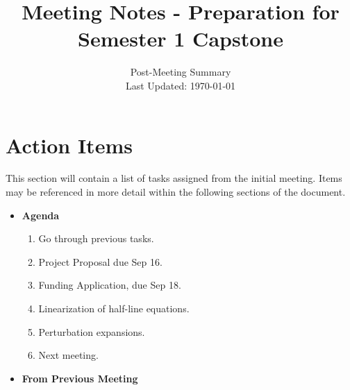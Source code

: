 \documentclass[a4paper,reqno]{article}
\title{Meeting Notes - Preparation for Semester 1 Capstone}
\date{Post-Meeting Summary\\Last Updated: \today}
\begin{document}
\maketitle
\section{Action Items}
 This section will contain a list of tasks assigned from the initial meeting. Items may be referenced in more detail within the following sections of the document.  
    \begin{itemize}
        \item \textbf{Agenda} 
            \begin{enumerate}
            	   \item Go through previous tasks.
                \item Project Proposal due Sep 16.
                \item Funding Application, due Sep 18.
                \item Linearization of half-line equations.
                \item Perturbation expansions.
                \item Next meeting.
            \end{enumerate}
        \item \textbf{From Previous Meeting}
            \begin{enumerate}
                

\end{enumerate}
\end{itemize}
\end{document}
